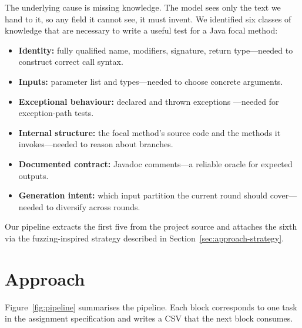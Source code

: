 \documentclass[conference]{IEEEtran}
\begin{document}
The underlying cause is missing knowledge. The model sees only the
text we hand to it, so any field it cannot see, it must invent. We
identified six classes of knowledge that are necessary to write a
useful test for a Java focal method:
\begin{itemize}
  \item \textbf{Identity:} fully qualified name, modifiers, signature,
        return type---needed to construct correct call syntax.
  \item \textbf{Inputs:} parameter list and types---needed to choose
        concrete arguments.
  \item \textbf{Exceptional behaviour:} declared and thrown exceptions
        ---needed for exception-path tests.
  \item \textbf{Internal structure:} the focal method's source code
        and the methods it invokes---needed to reason about branches.
  \item \textbf{Documented contract:} Javadoc comments---a reliable
        oracle for expected outputs.
  \item \textbf{Generation intent:} which input partition the current
        round should cover---needed to diversify across rounds.
\end{itemize}

Our pipeline extracts the first five from the project source and
attaches the sixth via the fuzzing-inspired strategy described in
Section~\ref{sec:approach-strategy}.

\section{Approach}
\label{sec:approach}

Figure~\ref{fig:pipeline} summarises the pipeline. Each block
corresponds to one task in the assignment specification and writes a
CSV that the next block consumes.
\end{document}
